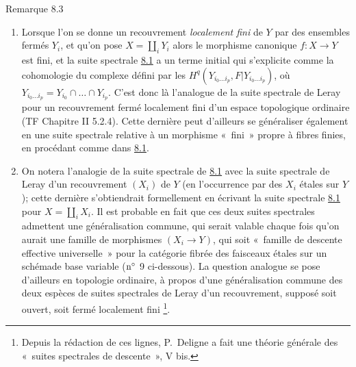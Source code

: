 \documentclass[10pt]{../fichiers-configuration-latex/smfart}
\begin{document}
\begin{enonce*}[remark]{Remarque 8.3}
\begin{enumerate}
\renewcommand{\theenumi}{\alph{enumi}}
\renewcommand{\labelenumi}{\theenumi)}
\item Lorsque l'on se donne un recouvrement \emph{localement fini} de
  $Y$ par des ensembles fermés $Y_{i}$, et qu'on pose
  $X=\coprod_{i}Y_{i}$ alors le morphisme canonique $f:X\rightarrow Y$
  est fini, et la suite spectrale \hyperref[VIII.prop8.1]{8.1} a un terme initial qui
  s'explicite comme la cohomologie du complexe défini par les
  $H^{q}(Y_{i_{0}\ldots i_{p}},F|Y_{i_{0}\ldots i_{p}})$, où
  $Y_{i_{0}\ldots i_{p}}=Y_{i_{0}}\cap\ldots\cap Y_{i_{p}}$. C'est
  donc là l'analogue de la suite spectrale de Leray pour un
  recouvrement fermé localement fini d'un espace topologique ordinaire
  (TF Chapitre II 5.2.4). Cette dernière peut d'ailleurs se
  généraliser également en une suite spectrale relative
  à un morphisme
  « fini » \ie propre à fibres finies, en procédant comme dans
  \hyperref[VIII.prop8.1]{8.1}.

\item On notera l'analogie de la suite spectrale de \hyperref[VIII.prop8.1]{8.1} avec la suite
  spectrale de Leray d'un recouvrement $(X_{i})$ de $Y$ (en
  l'occurrence par des $X_{i}$ étales sur $Y$); cette dernière
  s'obtiendrait formellement en écrivant la suite spectrale \hyperref[VIII.prop8.1]{8.1} pour
  $X=\coprod_{i}X_{i}$. Il est probable en fait que ces deux suites
  spectrales admettent une généralisation commune, qui serait valable
  chaque fois qu'on aurait une famille de morphismes
  $(X_{i}\rightarrow Y)$, qui soit « famille de descente effective
  universelle » pour la catégorie fibrée des faisceaux étales sur
  un schéma\pageoriginale  de base variable (\cf ${\rm n^{\circ}}$ 9
  ci-dessous). La question analogue se pose d'ailleurs en topologie
  ordinaire, à propos d'une généralisation commune des deux espèces de
  suites spectrales de Leray d'un recouvrement, supposé soit ouvert,
  soit fermé localement fini \footnote[1]{Depuis la rédaction de ces
  lignes, P. Deligne a fait une théorie générale des « suites
  spectrales de descente », \cf \Exp V bis.}.
\end{enumerate}
\end{enonce*}
\end{document}
